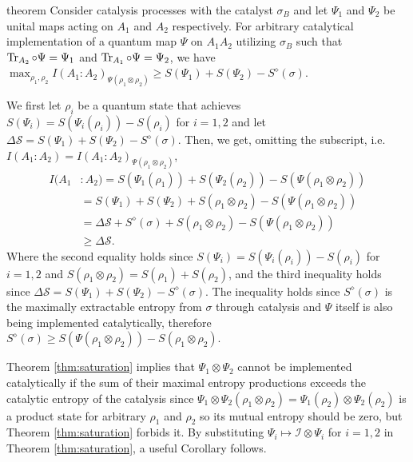 \documentclass[aps, reprint, amsmath,amssymb, prx, superscriptaddress]{revtex4-2}
\begin{document}
\begin{theoremEnd}{theorem} \label{thm:saturation}
    Consider catalysis processes with the catalyst $\sigma_B$ and let $\Psi_1$ and $\Psi_2$ be unital maps acting on $A_1$ and $A_2$ respectively. For arbitrary catalytical implementation of a quantum map $\Psi$ on $A_1A_2$ utilizing $\sigma_B$ such that $\Tr_{A_2}\circ\Psi = \Psi_1$ and $\Tr_{A_1}\circ\Psi=\Psi_2$, we have $\max_{\rho_1,\rho_2} I(A_1:A_2)_{\Psi(\rho_1\otimes\rho_2)}\geq S(\Psi_1)+S(\Psi_2)-S^\diamond(\sigma)$.  
\end{theoremEnd}
\begin{proofEnd}
    We first let $\rho_i$ be a quantum state that achieves $S(\Psi_i)=S(\Psi_i(\rho_i))-S(\rho_i)$ for $i=1,2$ and let $\Delta \mathcal{S}=S(\Psi_1)+S(\Psi_2)-S^\diamond(\sigma)$. Then, we get, omitting the subscript, i.e. $I(A_1:A_2)=I(A_1:A_2)_{\Psi(\rho_1\otimes\rho_2)}$,
    \begin{align*}
        I(A_1&:A_2)=S(\Psi_1(\rho_1))+S(\Psi_2(\rho_2))-S(\Psi(\rho_1\otimes\rho_2))\\
        &=S(\Psi_1)+S(\Psi_2)+S(\rho_1\otimes\rho_2)-S(\Psi(\rho_1\otimes\rho_2))\\
        &= \Delta \mathcal{S} + S^\diamond(\sigma)+S(\rho_1 \otimes \rho_2)-S(\Psi(\rho_1\otimes\rho_2))\\
        &\geq\Delta \mathcal{S}.
    \end{align*}
    Where the second equality holds since $S(\Psi_i)=S(\Psi_i(\rho_i))-S(\rho_i)$ for $i=1,2$ and  $S(\rho_1\otimes\rho_2)=S(\rho_1)+S(\rho_2)$, and the third inequality holds since $\Delta \mathcal{S}=S(\Psi_1)+S(\Psi_2)-S^\diamond(\sigma)$. The inequality holds since $S^\diamond(\sigma)$ is the maximally extractable entropy from $\sigma$ through catalysis and $\Psi$ itself is also being implemented catalytically, therefore $S^\diamond(\sigma)\geq S(\Psi(\rho_1\otimes \rho_2))-S(\rho_1\otimes \rho_2)$.
\end{proofEnd}
Theorem \ref{thm:saturation} implies that $\Psi_1\otimes\Psi_2$ cannot be implemented catalytically if the sum of their maximal entropy productions exceeds the catalytic entropy of the catalysis since $\Psi_1\otimes\Psi_2(\rho_1\otimes \rho_2)=\Psi_1(\rho_2)\otimes \Psi_2(\rho_2)$ is a product state for arbitrary $\rho_1$ and $\rho_2$ so its mutual entropy should be zero, but Theorem \ref{thm:saturation} forbids it. By substituting $\Psi_i \mapsto \mathcal{I}\otimes\Psi_i$ for $i=1,2$ in Theorem \ref{thm:saturation}, a useful Corollary follows.
\end{document}
